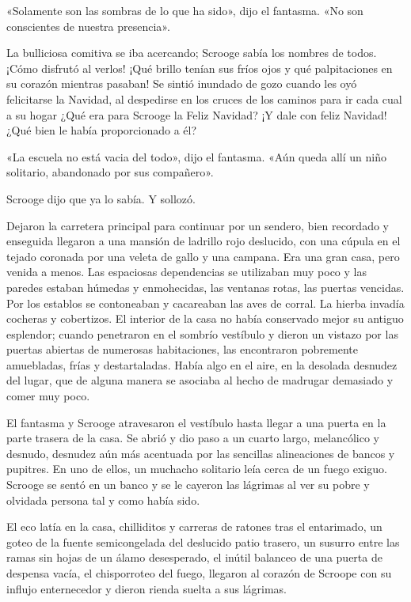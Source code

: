 \documentclass{novela}
\begin{document}
 «Solamente son las sombras de lo que ha sido», dijo el fantasma. «No son conscientes de nuestra presencia».

 La bulliciosa comitiva se iba acercando; Scrooge sabía los nombres de todos. ¡Cómo disfrutó al verlos! ¡Qué brillo tenían sus fríos ojos y qué palpitaciones en su corazón mientras pasaban! Se sintió inundado de gozo cuando les oyó felicitarse la Navidad, al despedirse en los cruces de los caminos para ir cada cual a su hogar ¿Qué era para Scrooge la Feliz Navidad? ¡Y dale con feliz Navidad! ¿Qué bien le había proporcionado a él?

 «La escuela no está vacia del todo», dijo el fantasma. «Aún queda allí un niño solitario, abandonado por sus compañero».

 Scrooge dijo que ya lo sabía. Y sollozó.

 Dejaron la carretera principal para continuar por un sendero, bien recordado y enseguida llegaron a una mansión de ladrillo rojo deslucido, con una cúpula en el tejado coronada por una veleta de gallo y una campana. Era una gran casa, pero venida a menos. Las espaciosas dependencias se utilizaban muy poco y las paredes estaban húmedas y enmohecidas, las ventanas rotas, las puertas vencidas. Por los establos se contoneaban y cacareaban las aves de corral. La hierba invadía cocheras y cobertizos. El interior de la casa no había conservado mejor su antiguo esplendor; cuando penetraron en el sombrío vestíbulo y dieron un vistazo por las puertas abiertas de numerosas habitaciones, las encontraron pobremente amuebladas, frías y destartaladas. Había algo en el aire, en la desolada desnudez del lugar, que de alguna manera se asociaba al hecho de madrugar demasiado y comer muy poco.

 El fantasma y Scrooge atravesaron el vestíbulo hasta llegar a una puerta en la parte trasera de la casa. Se abrió y dio paso a un cuarto largo, melancólico y desnudo, desnudez aún más acentuada por las sencillas alineaciones de bancos y pupitres. En uno de ellos, un muchacho solitario leía cerca de un fuego exiguo. Scrooge se sentó en un banco y se le cayeron las lágrimas al ver su pobre y olvidada persona tal y como había sido.

 El eco latía en la casa, chilliditos y carreras de ratones tras el entarimado, un goteo de la fuente semicongelada del deslucido patio trasero, un susurro entre las ramas sin hojas de un álamo desesperado, el inútil balanceo de una puerta de despensa vacía, el chisporroteo del fuego, llegaron al corazón de Scroope con su influjo enternecedor y dieron rienda suelta a sus lágrimas.
\end{document}
